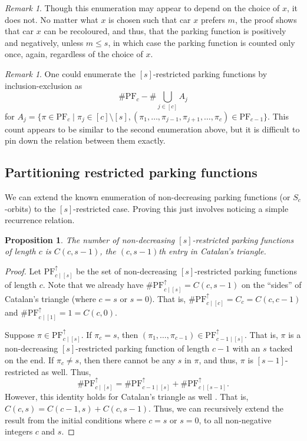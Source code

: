 \documentclass[12 pt]{amsart}
\newtheorem{proposition}[theorem]{Proposition}
\theoremstyle{definition} %
\theoremstyle{remark} %
\newtheorem{remark}[theorem]{Remark}
\begin{document}
\begin{remark}
	Though this enumeration may appear to depend on the choice of $x$, it does not. No matter what $x$ is chosen such that car $x$ prefers $m$, the proof shows that car $x$ can be recoloured, and thus, that the parking function is positively and negatively, unless $m \le s$, in which case the parking function is counted only once, again, regardless of the choice of $x$.
\end{remark}

\begin{remark}
	One could enumerate the $[s]$-restricted parking functions by inclusion-exclusion as
	\[
		\# \mathrm{PF}_{c} - \# \bigcup_{j \in [c]} A_{j}
	\]
	for $A_{j} = \{ \pi \in \mathrm{PF}_{c} \mid \pi_{j} \in [c] \setminus [s], (\pi_{1}, \dots, \pi_{j - 1}, \pi_{j + 1}, \dots, \pi_{c}) \in \mathrm{PF}_{c - 1} \}$. This count appears to be similar to the second enumeration above, but it is difficult to pin down the relation between them exactly.
\end{remark}

\subsection{Partitioning restricted parking functions}

We can extend the known enumeration of non-decreasing parking functions (or $S_{c}$-orbits) to the $[s]$-restricted case. Proving this just involves noticing a simple recurrence relation.

\begin{proposition}
	The number of non-decreasing $[s]$-restricted parking functions of length $c$ is $C(c, s - 1)$, the $(c, s - 1)$th entry in Catalan's triangle.
\end{proposition}

\begin{proof}
	Let $\mathrm{PF}^{\uparrow}_{c \mid [s]}$ be the set of non-decreasing $[s]$-restricted parking functions of length $c$. Note that we already have $\# \mathrm{PF}^{\uparrow}_{c \mid [s]} = C(c, s - 1)$ on the ``sides'' of Catalan's triangle (where $c = s$ or $s = 0$). That is, $\# \mathrm{PF}^{\uparrow}_{c \mid [c]} = C_{c} = C(c, c - 1)$ and $\# \mathrm{PF}^{\uparrow}_{c \mid [1]} = 1 = C(c, 0)$.

	Suppose $\pi \in \mathrm{PF}^{\uparrow}_{c \mid [s]}$. If $\pi_{c} = s$, then $(\pi_{1}, \dots, \pi_{c - 1}) \in \mathrm{PF}^{\uparrow}_{c - 1 \mid [s]}$. That is, $\pi$ is a non-decreasing $[s]$-restricted parking function of length $c - 1$ with an $s$ tacked on the end. If $\pi_{c} \neq s$, then there cannot be any $s$ in $\pi$, and thus, $\pi$ is $[s - 1]$-restricted as well. Thus,
	\[
		\# \mathrm{PF}^{\uparrow}_{c \mid [s]} = \# \mathrm{PF}^{\uparrow}_{c - 1 \mid [s]} + \# \mathrm{PF}^{\uparrow}_{c \mid [s - 1]}.
	\]
	However, this identity holds for Catalan's triangle as well \cite{bailey-1996}. That is, $C(c, s) = C(c - 1, s) + C(c, s - 1)$. Thus, we can recursively extend the result from the initial conditions where $c = s$ or $s = 0$, to all non-negative integers $c$ and $s$.
\end{proof}
\end{document}
